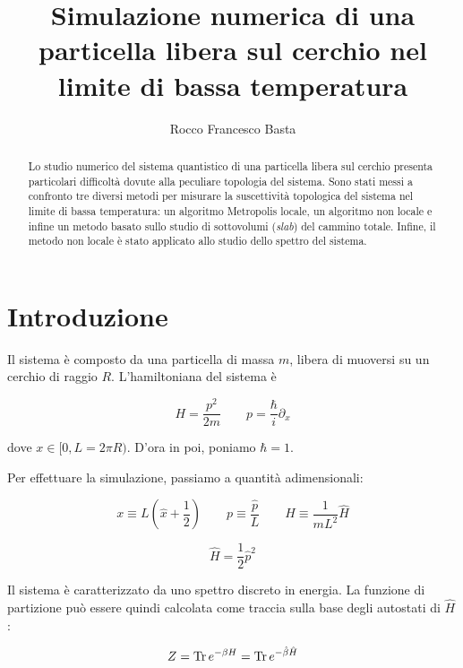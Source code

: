 \documentclass[a4paper,11pt]{article}
\title{Simulazione numerica di una particella libera sul cerchio nel limite di bassa temperatura}
\author{Rocco Francesco Basta}
\date{}
\begin{document}
\maketitle

\begin{abstract}
    Lo studio numerico del sistema quantistico di una particella libera sul cerchio presenta particolari difficoltà dovute alla peculiare topologia del sistema. Sono stati messi a confronto tre diversi metodi per misurare la suscettività topologica del sistema nel limite di bassa temperatura: un algoritmo Metropolis locale, un algoritmo non locale e infine un metodo basato sullo studio di sottovolumi (\emph{slab}) del cammino totale. Infine, il metodo non locale è stato applicato allo studio dello spettro del sistema. 
\end{abstract}

\section{Introduzione}

    Il sistema è composto da una particella di massa $m$, libera di muoversi su un cerchio di raggio $R$. L'hamiltoniana del sistema è
    
    \begin{equation}
        H = \frac{p^2}{2m} \quad \quad p = \frac{\hbar}{i} \partial_x
    \end{equation}
    
    dove $x \in [0, L = 2\pi R)$. D'ora in poi, poniamo $\hbar = 1$.
    
    Per effettuare la simulazione, passiamo a quantità adimensionali:
    
    \begin{equation}
        x \equiv L\left(\hat{x} + \frac{1}{ 2} \right) \quad \quad
        p \equiv \frac{\hat{p}}{L} \quad \quad 
        H \equiv \frac{1}{mL^2} \hat{H}
    \end{equation}
    
    \begin{equation}
        \hat{H} = \frac{1}{2} \hat{p}^2
    \end{equation}
    
    Il sistema è caratterizzato da uno spettro discreto in energia. La funzione di partizione può essere quindi calcolata come traccia sulla base degli autostati di $\hat{H}$:
    
    \begin{equation}
        Z = \Tr e^{-\beta H} = \Tr e^{-\hat{\beta} \hat{H}}
    \end{equation}
    
\end{document}
